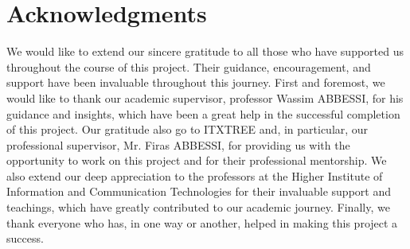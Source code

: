 

\chapter*{Acknowledgments}
\vskip0.5cm
We would like to extend our sincere gratitude to all those who have supported us throughout the course of this project. Their guidance, encouragement, and support have been invaluable throughout this journey.
\vskip0.5cm
First and foremost, we would like to thank our academic supervisor, professor Wassim ABBESSI, for his guidance and insights, which have been a great help in the successful completion of this project.
\vskip0.5cm
Our gratitude also go to ITXTREE and, in particular, our professional supervisor, Mr. Firas ABBESSI, for providing us with the opportunity to work on this project and for their professional mentorship.
\vskip0.5cm
We also extend our deep appreciation to the professors at the Higher Institute of Information and Communication Technologies for their invaluable support and teachings, which have greatly contributed to our academic journey.
\vskip0.5cm
Finally, we thank everyone who has, in one way or another, helped in making this project a success.

